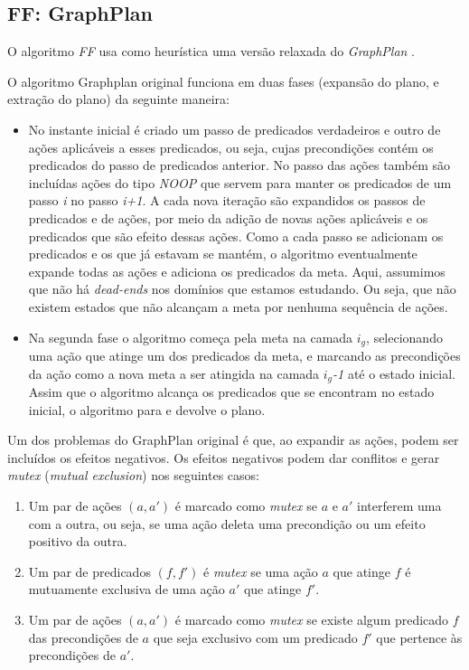 \subsection{FF: GraphPlan}\label{heuristicas:graphplan}

O algoritmo \textit{FF} usa como heurística uma versão relaxada do \textit{GraphPlan} \cite{Blum1997281}. 

O algoritmo Graphplan original funciona em duas fases (expansão do plano, e extração do plano) da seguinte maneira:
\begin{itemize}
\item No instante inicial é criado um passo de predicados verdadeiros e outro de ações aplicáveis a esses predicados, ou seja, cujas precondições contém os predicados do passo de predicados anterior.
No passo das ações também são incluídas ações do tipo \textit{NOOP} que servem para manter os predicados de um passo \textit{i} no passo \textit{i+1}.
A cada nova iteração são expandidos os passos de predicados e de ações, por meio da adição de novas ações aplicáveis e os predicados que são efeito dessas ações.
Como a cada passo se adicionam os predicados e os que já estavam se mantém, o algoritmo eventualmente expande todas as ações e adiciona os predicados da meta. Aqui, assumimos que não há \textit{dead-ends} nos domínios que estamos estudando. Ou seja, que não existem estados que não alcançam a meta por nenhuma sequência de ações.
\item Na segunda fase o algoritmo começa pela meta na camada \textit{$i_g$}, selecionando uma ação que atinge um dos predicados da meta, e marcando as precondições da ação como a nova meta a ser atingida na camada \textit{$i_g$-1} até o estado inicial. 
Assim que o algoritmo alcança os predicados que se encontram no estado inicial, o algoritmo para e devolve o plano.
\end{itemize}



Um dos problemas do GraphPlan original é que, ao expandir as ações, podem ser incluídos os efeitos negativos.
Os efeitos negativos podem dar conflitos e gerar \textit{mutex} (\textit{mutual exclusion}) nos seguintes casos:
\begin{enumerate}
\item Um par de ações $(a,a')$ é marcado como \textit{mutex} se $a$ e $a'$ interferem uma com a outra, ou seja, se uma ação deleta uma precondição ou um efeito positivo da outra.
\item Um par de predicados $(f,f')$ é \textit{mutex} se uma ação $a$ que atinge $f$ é mutuamente exclusiva de uma ação $a'$ que atinge $f'$.
\item Um par de ações $(a,a')$ é marcado como \textit{mutex} se existe algum predicado $f$ das precondições de $a$ que seja exclusivo com um predicado $f'$ que pertence às precondições de $a'$.
\end{enumerate}

